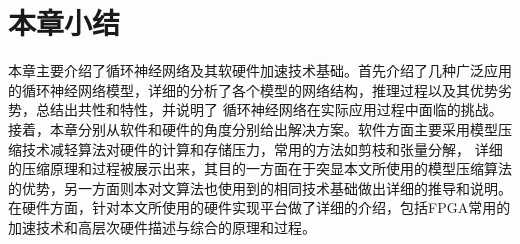 \section{本章小结}
本章主要介绍了循环神经网络及其软硬件加速技术基础。首先介绍了几种广泛应用的循环神经网络模型，详细的分析了各个模型的网络结构，推理过程以及其优势劣势，总结出共性和特性，并说明了
循环神经网络在实际应用过程中面临的挑战。接着，本章分别从软件和硬件的角度分别给出解决方案。软件方面主要采用模型压缩技术减轻算法对硬件的计算和存储压力，常用的方法如剪枝和张量分解，
详细的压缩原理和过程被展示出来，其目的一方面在于突显本文所使用的模型压缩算法的优势，另一方面则本对文算法也使用到的相同技术基础做出详细的推导和说明。
在硬件方面，针对本文所使用的硬件实现平台做了详细的介绍，包括FPGA常用的加速技术和高层次硬件描述与综合的原理和过程。

